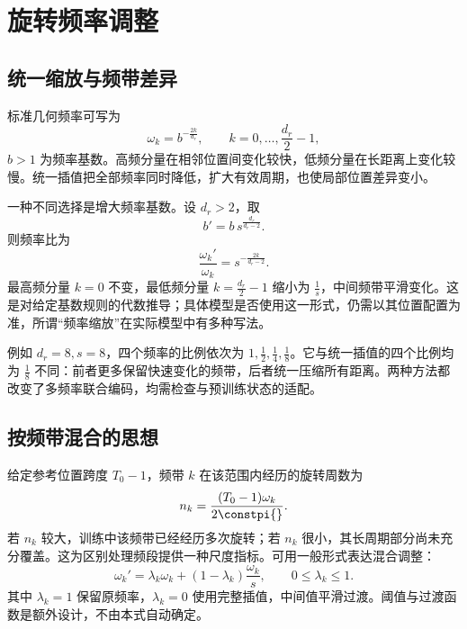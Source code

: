 \documentclass[../textbook.tex]{subfiles}
\begin{document}
\section{旋转频率调整}
\optional
\subsection{统一缩放与频带差异}
标准几何频率可写为
\begin{equation}
 \omega_k=b^{-\frac{2k}{d_r}},\qquad k=0,\ldots,\frac{d_r}{2}-1,
\end{equation}
$b>1$ 为频率基数。高频分量在相邻位置间变化较快，低频分量在长距离上变化较慢。统一插值把全部频率同时降低，扩大有效周期，也使局部位置差异变小。

一种不同选择是增大频率基数。设 $d_r>2$，取
\begin{equation}\label{eq:lc-base}
 b'=b\,s^{\frac{d_r}{d_r-2}}.
\end{equation}
则频率比为
\begin{equation}
 \frac{\omega_k'}{\omega_k}=s^{-\frac{2k}{d_r-2}}.
\end{equation}
最高频分量 $k=0$ 不变，最低频分量 $k=\frac{d_r}{2}-1$ 缩小为 $\frac{1}{s}$，中间频带平滑变化。这是对给定基数规则的代数推导；具体模型是否使用这一形式，仍需以其位置配置为准，所谓“频率缩放”在实际模型中有多种写法。

例如 $d_r=8,s=8$，四个频率的比例依次为 $1,\frac{1}{2},\frac{1}{4},\frac{1}{8}$。它与统一插值的四个比例均为 $\frac{1}{8}$ 不同：前者更多保留快速变化的频带，后者统一压缩所有距离。两种方法都改变了多频率联合编码，均需检查与预训练状态的适配。

\subsection{按频带混合的思想}
给定参考位置跨度 $T_0-1$，频带 $k$ 在该范围内经历的旋转周数为
\begin{equation}
 n_k=\frac{(T_0-1)\omega_k}{2\constpi{}}.
\end{equation}
若 $n_k$ 较大，训练中该频带已经经历多次旋转；若 $n_k$ 很小，其长周期部分尚未充分覆盖。这为区别处理频段提供一种尺度指标。可用一般形式表达混合调整：
\begin{equation}\label{eq:lc-band}
 \omega_k'=\lambda_k\omega_k+(1-\lambda_k)\frac{\omega_k}{s},
 \qquad0\le\lambda_k\le1.
\end{equation}
其中 $\lambda_k=1$ 保留原频率，$\lambda_k=0$ 使用完整插值，中间值平滑过渡。阈值与过渡函数是额外设计，不由本式自动确定。
\end{document}
